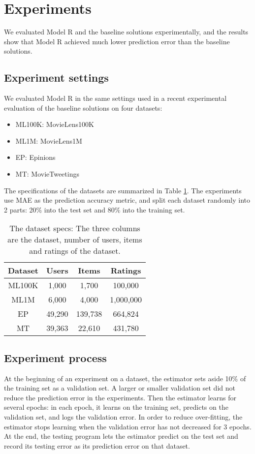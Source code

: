 \documentclass[conference]{IEEEtran}
\begin{document}
\section{Experiments}
We evaluated Model R and the baseline solutions experimentally,
and the results show that Model R achieved much lower prediction error than 
the baseline solutions.

\subsection{Experiment settings}
We evaluated Model R in the same settings used in a recent experimental 
evaluation of the baseline solutions \cite{polatidis2016multi} on four datasets:
\begin{itemize}
	\item ML100K: MovieLens100K \cite{harper2015movielens}
	\item ML1M: MovieLens1M \cite{harper2015movielens}
	\item EP: Epinions \cite{massa2007trust}
	\item MT: MovieTweetings \cite{dooms2013movietweetings}
\end{itemize}
The specifications of the datasets are summarized in Table \ref{tab:dataset}.
The experiments use MAE as the prediction accuracy metric,
and split each dataset randomly into 2 parts: 20\% into the test set and 80\% 
into the training set.
\begin{table}[!ht]
	\centering
	\caption{The dataset specs: 
		The three columns are the dataset, number of users, items and ratings 
		of the dataset.
	}
	\begin{tabular}{cccc}  \hline
		Dataset & Users   & Items   & Ratings \\ \hline
		ML100K  & 1,000   & 1,700   & 100,000 \\ \hline
		ML1M    & 6,000   & 4,000   & 1,000,000 \\ \hline
		EP      & 49,290  & 139,738 & 664,824 \\ \hline
		MT      & 39,363  & 22,610  & 431,780 \\ \hline
	\end{tabular}
	\label{tab:dataset}
\end{table}

\subsection{Experiment process}
At the beginning of an experiment on a dataset,
the estimator sets aside 10\% of the training set as a validation set.
A larger or smaller validation set did not reduce the prediction error in the 
experiments.
Then the estimator learns for several epochs:
in each epoch,
it learns on the training set,
predicts on the validation set,
and logs the validation error.
In order to reduce over-fitting,
the estimator stops learning when the validation error has not decreased for 3 
epochs.
At the end, the testing program lets the estimator predict on the test set 
and record its testing error as its prediction error on that dataset.
\end{document}
